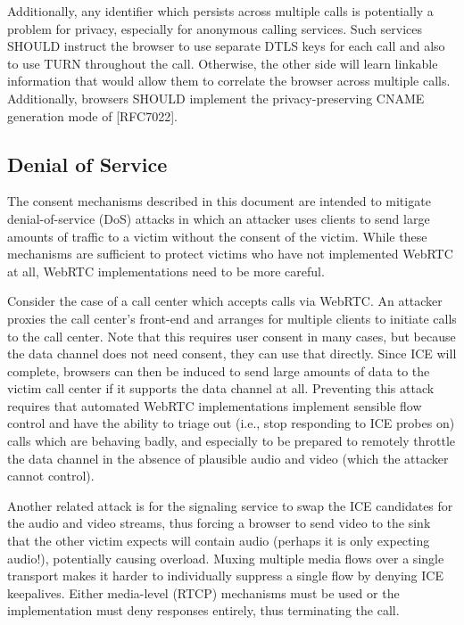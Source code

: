 \documentclass{article}
\begin{document}
Additionally, any identifier which persists across multiple calls is
potentially a problem for privacy, especially for anonymous calling
services.  Such services SHOULD instruct the browser to use separate
DTLS keys for each call and also to use TURN throughout the call.
Otherwise, the other side will learn linkable information that would
allow them to correlate the browser across multiple calls.
Additionally, browsers SHOULD implement the privacy-preserving CNAME
generation mode of [RFC7022].

\subsection{Denial of Service}

The consent mechanisms described in this document are intended to
mitigate denial-of-service (DoS) attacks in which an attacker uses
clients to send large amounts of traffic to a victim without the
consent of the victim.  While these mechanisms are sufficient to
protect victims who have not implemented WebRTC at all, WebRTC
implementations need to be more careful.

Consider the case of a call center which accepts calls via WebRTC.
An attacker proxies the call center's front-end and arranges for
multiple clients to initiate calls to the call center.  Note that
this requires user consent in many cases, but because the data
channel does not need consent, they can use that directly.  Since ICE
will complete, browsers can then be induced to send large amounts of
data to the victim call center if it supports the data channel at
all.  Preventing this attack requires that automated WebRTC
implementations implement sensible flow control and have the ability
to triage out (i.e., stop responding to ICE probes on) calls which
are behaving badly, and especially to be prepared to remotely
throttle the data channel in the absence of plausible audio and video
(which the attacker cannot control).

Another related attack is for the signaling service to swap the ICE
candidates for the audio and video streams, thus forcing a browser to
send video to the sink that the other victim expects will contain
audio (perhaps it is only expecting audio!), potentially causing
overload.  Muxing multiple media flows over a single transport makes
it harder to individually suppress a single flow by denying ICE
keepalives.  Either media-level (RTCP) mechanisms must be used or the
implementation must deny responses entirely, thus terminating the
call.
\end{document}
